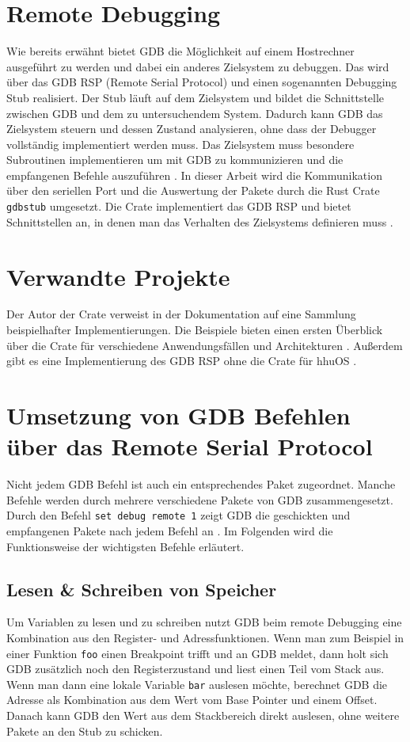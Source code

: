 \section{Remote Debugging}
Wie bereits erwähnt bietet GDB die Möglichkeit auf einem Hostrechner ausgeführt zu werden und dabei ein anderes Zielsystem zu debuggen. Das wird über das GDB RSP (Remote Serial Protocol) und einen sogenannten Debugging Stub realisiert. Der Stub läuft auf dem Zielsystem und bildet die Schnittstelle zwischen GDB und dem zu untersuchendem System. Dadurch kann GDB das Zielsystem steuern und dessen Zustand analysieren, ohne dass der Debugger vollständig implementiert werden muss. Das Zielsystem muss besondere Subroutinen implementieren um mit GDB zu kommunizieren und die empfangenen Befehle auszuführen \cite{gdb}. In dieser Arbeit wird die Kommunikation über den seriellen Port und die Auswertung der Pakete durch die Rust Crate \texttt{gdbstub} umgesetzt. Die Crate implementiert das GDB RSP und bietet Schnittstellen an, in denen man das Verhalten des Zielsystems definieren muss \cite{gdbstub}. 

\section{Verwandte Projekte}
Der Autor der Crate verweist in der Dokumentation auf eine Sammlung beispielhafter Implementierungen. Die Beispiele bieten einen ersten Überblick über die Crate für verschiedene Anwendungsfällen und Architekturen \cite{gdbstub}. Außerdem gibt es eine Implementierung des GDB RSP ohne die Crate für hhuOS \cite{hhuos}.

\section{Umsetzung von GDB Befehlen über das Remote Serial Protocol}
Nicht jedem GDB Befehl ist auch ein entsprechendes Paket zugeordnet. Manche Befehle werden durch mehrere verschiedene Pakete von GDB zusammengesetzt. Durch den Befehl \texttt{set debug remote 1} zeigt GDB die geschickten und empfangenen Pakete nach jedem Befehl an \cite{gdb}. Im Folgenden wird die Funktionsweise der wichtigsten Befehle erläutert.

\subsection{Lesen \& Schreiben von Speicher}
Um Variablen zu lesen und zu schreiben nutzt GDB beim remote Debugging eine Kombination aus den Register- und Adressfunktionen. Wenn man zum Beispiel in einer Funktion \texttt{foo} einen Breakpoint trifft und an GDB meldet, dann holt sich GDB zusätzlich noch den Registerzustand und liest einen Teil vom Stack aus. Wenn man dann eine lokale Variable \texttt{bar} auslesen möchte, berechnet GDB die Adresse als Kombination aus dem Wert vom Base Pointer und einem Offset. Danach kann GDB den Wert aus dem Stackbereich direkt auslesen, ohne weitere Pakete an den Stub zu schicken.


